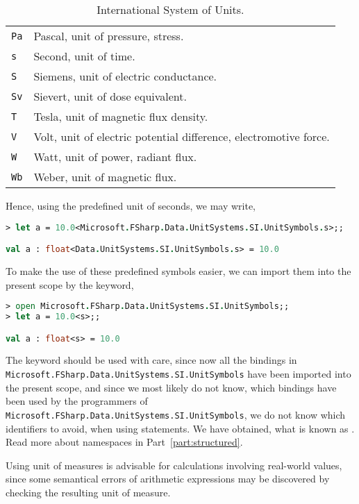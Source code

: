 \begin{table}
\begin{tabularx}{0.75\linewidth}{|l|X|}
    \lstinline|Pa|&Pascal, unit of pressure, stress.\\
    \lstinline|s|&Second, unit of time.\\
    \lstinline|S|&Siemens, unit of electric conductance.\\
    \lstinline|Sv|&Sievert, unit of dose equivalent.\\
    \lstinline|T|&Tesla, unit of magnetic flux density.\\
    \lstinline|V|&Volt, unit of electric potential difference, electromotive force.\\
    \lstinline|W|&Watt, unit of power, radiant flux.\\
    \lstinline|Wb|&Weber, unit of magnetic flux.\\
    \hline
  \end{tabularx}
  \caption{International System of Units.}
  \label{tab:siUnits}
\end{table}
Hence, using the predefined unit of seconds, we may write,
%
\begin{lstlisting}[language=fsharp,caption={fsharpi, SI unit of measures are built-in.}]
> let a = 10.0<Microsoft.FSharp.Data.UnitSystems.SI.UnitSymbols.s>;;

val a : float<Data.UnitSystems.SI.UnitSymbols.s> = 10.0
\end{lstlisting}
To make the use of these predefined symbols easier, we can import them into the present scope by the  keyword,
%
\begin{lstlisting}[language=fsharp,caption={fsharpi, simpler syntax by importing, but beware of namespace polution.}]
> open Microsoft.FSharp.Data.UnitSystems.SI.UnitSymbols;;
> let a = 10.0<s>;;

val a : float<s> = 10.0
\end{lstlisting}
The  keyword should be used with care, since now all the bindings in \lstinline|Microsoft.FSharp.Data.UnitSystems.SI.UnitSymbols| have been imported into the present scope, and since we most likely do not know, which bindings have been used by the programmers of \lstinline|Microsoft.FSharp.Data.UnitSystems.SI.UnitSymbols|, we do not know which identifiers to avoid, when using  statements. We have obtained, what is known as . Read more about namespaces in Part~\ref{part:structured}.

Using unit of measures is advisable for calculations involving real-world values, since some semantical errors of arithmetic expressions may be discovered by checking the resulting unit of measure.

